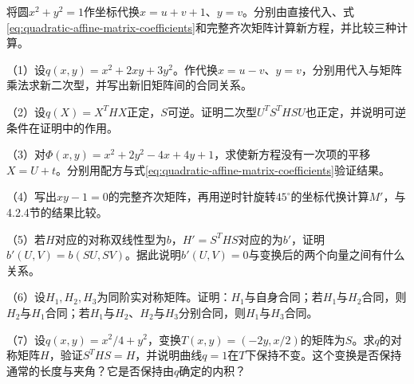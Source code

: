 \begin{samepage}
\begin{example}\label{ex:quadratic-matrix-substitution}
将圆\(x^2+y^2=1\)作坐标代换\(x=u+v+1\)、\(y=v\)。分别由直接代入、式\eqref{eq:quadratic-affine-matrix-coefficients}和完整齐次矩阵计算新方程，并比较三种计算。
\end{example}
\end{samepage}

\begin{exercise}
\mbox{}

（1）设\(q(x,y)=x^2+2xy+3y^2\)。作代换\(x=u-v\)、\(y=v\)，分别用代入与矩阵乘法求新二次型，并写出新旧矩阵间的合同关系。

（2）设\(q(X)=X^THX\)正定，\(S\)可逆。证明二次型\(U^TS^THSU\)也正定，并说明可逆条件在证明中的作用。

（3）对\(\Phi(x,y)=x^2+2y^2-4x+4y+1\)，求使新方程没有一次项的平移\(X=U+t\)。分别用配方与式\eqref{eq:quadratic-affine-matrix-coefficients}验证结果。

（4）写出\(xy-1=0\)的完整齐次矩阵，再用逆时针旋转\(45^\circ\)的坐标代换计算\(M'\)，与4.2.4节的结果比较。

（5）若\(H\)对应的对称双线性型为\(b\)，\(H'=S^THS\)对应的为\(b'\)，证明\(b'(U,V)=b(SU,SV)\)。据此说明\(b'(U,V)=0\)与变换后的两个向量之间有什么关系。

（6）设\(H_1,H_2,H_3\)为同阶实对称矩阵。证明：\(H_1\)与自身合同；若\(H_1\)与\(H_2\)合同，则\(H_2\)与\(H_1\)合同；若\(H_1\)与\(H_2\)、\(H_2\)与\(H_3\)分别合同，则\(H_1\)与\(H_3\)合同。

（7）设\(q(x,y)=x^2/4+y^2\)，变换\(T(x,y)=(-2y,x/2)\)的矩阵为\(S\)。求\(q\)的对称矩阵\(H\)，验证\(S^THS=H\)，并说明曲线\(q=1\)在\(T\)下保持不变。这个变换是否保持通常的长度与夹角？它是否保持由\(q\)确定的内积？
\end{exercise}
\newpage
